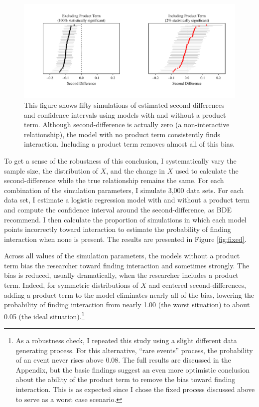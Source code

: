 \documentclass[12pt]{article}
\begin{document}
\begin{figure}[h]
\begin{center}
\includegraphics[scale=.7]{fig/fig-plotted-cis.pdf}
\end{center}
\caption{This figure shows fifty simulations of estimated second-differences and confidence intervals using models with and without a product term. Although second-difference is actually zero (a non-interactive relationship), the model with no product term consistently finds interaction. Including a product term removes almost all of this bias.}\label{fig:plotted-cis}
\end{figure}

To get a sense of the robustness of this conclusion, I systematically vary the sample size, the distribution of $X$, and the change in $X$ used to calculate the second-difference while the true relationship remains the same. For each combination of the simulation parameters, I simulate 3,000 data sets. For each data set, I estimate a logistic regression model with and without a product term and compute the confidence interval around the second-difference, as BDE recommend. I then calculate the proportion of simulations in which each model points incorrectly toward interaction to estimate the probability of finding interaction when none is present. The results are presented in Figure \ref{fig:fixed}.

Across all values of the simulation parameters, the models without a product term bias the researcher toward finding interaction and sometimes strongly. The bias is reduced, usually dramatically, when the researcher includes a product term. Indeed, for symmetric distributions of $X$ and centered second-differences, adding a product term to the model eliminates nearly all of the bias, lowering the probability of finding interaction
from nearly 1.00 (the worst  situation) to about 0.05 (the ideal situation).\footnote{As a robustness check, I repeated this study using a slight different data generating process. For this alternative, ``rare events'' process, the probability of an event never rises above 0.08. The full results are discussed in the Appendix, but the basic findings suggest an even more optimistic conclusion about the ability of the product term to remove the bias toward finding interaction. This is as expected since I chose the fixed process discussed above to serve as a worst case scenario.}
\end{document}
